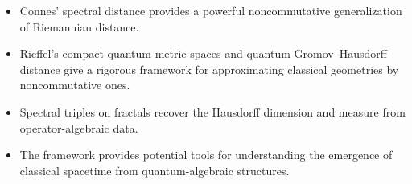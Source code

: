\documentclass[11pt,a4paper]{article}
\begin{document}
\begin{itemize}[nosep]
  \item Connes' spectral distance provides a powerful noncommutative
        generalization of Riemannian distance.
  \item Rieffel's compact quantum metric spaces and quantum Gromov--Hausdorff
        distance give a rigorous framework for approximating classical
        geometries by noncommutative ones.
  \item Spectral triples on fractals recover the Hausdorff dimension and
        measure from operator-algebraic data.
  \item The framework provides potential tools for understanding the
        emergence of classical spacetime from quantum-algebraic structures.
\end{itemize}
\end{document}
